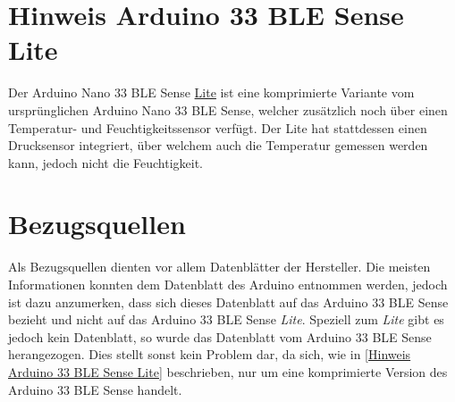 \section{Hinweis Arduino 33 BLE Sense Lite \label{Hinweis Arduino 33 BLE Sense Lite}}
Der Arduino Nano 33 BLE Sense \underline{Lite} ist eine komprimierte Variante vom ursprünglichen Arduino Nano 33 BLE Sense, welcher zusätzlich noch über einen Temperatur- und Feuchtigkeitssensor verfügt. Der Lite hat stattdessen einen Drucksensor integriert, über welchem auch die Temperatur gemessen werden kann, jedoch nicht die Feuchtigkeit.\cite{PetrFilipi.2022}
\section{Bezugsquellen}
Als Bezugsquellen dienten vor allem Datenblätter der Hersteller. Die meisten Informationen konnten dem Datenblatt des Arduino entnommen werden, jedoch ist dazu anzumerken, dass sich dieses Datenblatt auf das Arduino 33 BLE Sense bezieht und nicht auf das Arduino 33 BLE Sense \emph{Lite}. Speziell zum \emph{Lite} gibt es jedoch kein Datenblatt, so wurde das Datenblatt vom Arduino 33 BLE Sense herangezogen. Dies stellt sonst kein Problem dar, da sich, wie in \ref{Hinweis Arduino 33 BLE Sense Lite} beschrieben, nur um eine komprimierte Version des Arduino 33 BLE Sense handelt.


